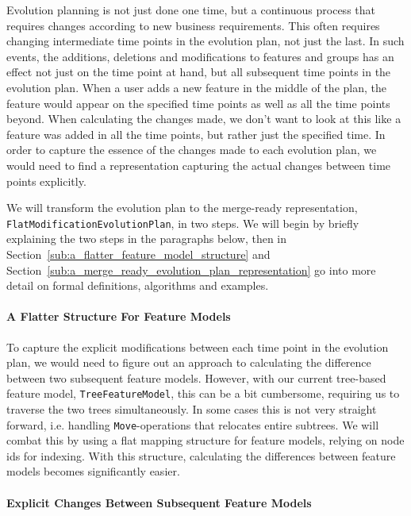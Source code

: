 \documentclass[a4paper,english]{ifimaster}
\begin{document}
Evolution planning is not just done one time, but a continuous process that requires changes according to new business requirements. This often requires changing intermediate time points in the evolution plan, not just the last. In such events, the additions, deletions and modifications to features and groups has an effect not just on the time point at hand, but all subsequent time points in the evolution plan. When a user adds a new feature in the middle of the plan, the feature would appear on the specified time points as well as all the time points beyond. When calculating the changes made, we don't want to look at this like a feature was added in all the time points, but rather just the specified time. In order to capture the essence of the changes made to each evolution plan, we would need to find a representation capturing the actual changes between time points explicitly.

We will transform the evolution plan to the merge-ready representation, \texttt{Flat\-Modification\-Evolution\-Plan}, in two steps. We will begin by briefly explaining the two steps in the paragraphs below, then in Section~\vref{sub:a_flatter_feature_model_structure} and Section~\vref{sub:a_merge_ready_evolution_plan_representation} go into more detail on formal definitions, algorithms and examples.

\paragraph{A Flatter Structure For Feature Models}%
\label{par:a_flatter_structure_for_feature_models}

To capture the explicit modifications between each time point in the evolution plan, we would need to figure out an approach to calculating the difference between two subsequent feature models. However, with our current tree-based feature model, \texttt{Tree\-Feature\-Model}, this can be a bit cumbersome, requiring us to traverse the two trees simultaneously. In some cases this is not very straight forward, i.e. handling \texttt{Move}-operations that relocates entire subtrees. We will combat this by using a flat mapping structure for feature models, relying on node ids for indexing. With this structure, calculating the differences between feature models becomes significantly easier. 

\paragraph{Explicit Changes Between Subsequent Feature Models}%
\label{par:explicit_changes_between_subsequent_feature_models}
\end{document}
